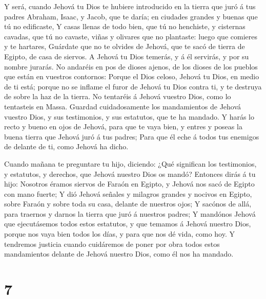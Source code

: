  Y será, cuando Jehová tu Dios te hubiere introducido en la
tierra que juró á tus padres Abraham, Isaac, y Jacob, que te daría; en
ciudades grandes y buenas que tú no edificaste,  Y casas
llenas de todo bien, que tú no henchiste, y cisternas cavadas, que tú no
cavaste, viñas y olivares que no plantaste: luego que comieres y te
hartares,  Guárdate que no te olvides de Jehová, que te
sacó de tierra de Egipto, de casa de siervos.  A Jehová tu
Dios temerás, y á él servirás, y por su nombre jurarás.  No
andaréis en pos de dioses ajenos, de los dioses de los pueblos que están
en vuestros contornos:  Porque el Dios celoso, Jehová tu
Dios, en medio de ti está; porque no se inflame el furor de Jehová tu
Dios contra ti, y te destruya de sobre la haz de la tierra.
 No tentaréis á Jehová vuestro Dios, como lo tentasteis en
Massa.  Guardad cuidadosamente los mandamientos de Jehová
vuestro Dios, y sus testimonios, y sus estatutos, que te ha mandado.
 Y harás lo recto y bueno en ojos de Jehová, para que te
vaya bien, y entres y poseas la buena tierra que Jehová juró á tus
padres;  Para que él eche á todos tus enemigos de delante
de ti, como Jehová ha dicho.

 Cuando mañana te preguntare tu hijo, diciendo: ¿Qué
significan los testimonios, y estatutos, y derechos, que Jehová nuestro
Dios os mandó?  Entonces dirás á tu hijo: Nosotros éramos
siervos de Faraón en Egipto, y Jehová nos sacó de Egipto con mano
fuerte;  Y dió Jehová señales y milagros grandes y nocivos
en Egipto, sobre Faraón y sobre toda su casa, delante de nuestros ojos;
 Y sacónos de allá, para traernos y darnos la tierra que
juró á nuestros padres;  Y mandónos Jehová que ejecutásemos
todos estos estatutos, y que temamos á Jehová nuestro Dios, porque nos
vaya bien todos los días, y para que nos dé vida, como hoy.
 Y tendremos justicia cuando cuidáremos de poner por obra
todos estos mandamientos delante de Jehová nuestro Dios, como él nos ha
mandado.

\hypertarget{section-6}{%
\section{7}\label{section-6}}

